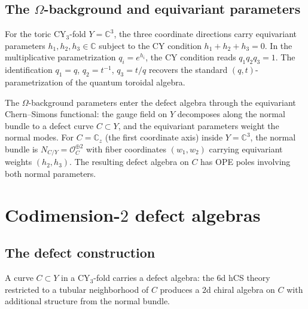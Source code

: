 \documentclass[11pt]{article}
\theoremstyle{plain}
\theoremstyle{definition}
\theoremstyle{remark}
\newcommand{\cO}{\mathcal{O}}
\newcommand{\bC}{\mathbb{C}}
\begin{document}
\subsection{The $\Omega$-background and equivariant parameters}

For the toric CY$_3$-fold $Y = \bC^3$, the three coordinate
directions carry equivariant parameters
$h_1, h_2, h_3 \in \bC$ subject to the CY condition
$h_1 + h_2 + h_3 = 0$.  In the multiplicative parametrization
$q_i = e^{h_i}$, the CY condition reads $q_1 q_2 q_3 = 1$.  The
identification $q_1 = q$, $q_2 = t^{-1}$,
$q_3 = t/q$ recovers the standard $(q,t)$-parametrization of the
quantum toroidal algebra.

The $\Omega$-background parameters enter the defect algebra through
the equivariant Chern--Simons functional: the gauge field on $Y$
decomposes along the normal bundle to a defect curve
$C \subset Y$, and the equivariant parameters weight the normal
modes.  For $C = \bC_z$ (the first coordinate axis) inside
$Y = \bC^3$, the normal bundle is
$N_{C/Y} = \cO_C^{\oplus 2}$ with fiber coordinates
$(w_1, w_2)$ carrying equivariant weights $(h_2, h_3)$.  The
resulting defect algebra on $C$ has OPE poles involving both normal
parameters.



\section{Codimension-$2$ defect algebras}
\label{sec:codim2}

\subsection{The defect construction}

A curve $C \subset Y$ in a CY$_3$-fold carries a defect algebra:
the $6$d hCS theory restricted to a tubular neighborhood of $C$
produces a $2$d chiral algebra on $C$ with additional structure from
the normal bundle.
\end{document}
